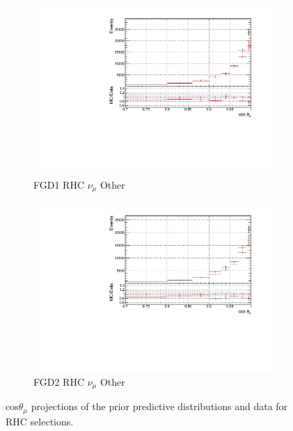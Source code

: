 \begin{figure}[!h]
\begin{subfigure}{0.49\textwidth}
  \centering
  \includegraphics[width=\textwidth]{figs/prioronly1D_t_FGD1_NuMuBkg_CCOther_in_AntiNu_Mode}
  \caption{FGD1 RHC $\nu_{\mu}$ Other}
\end{subfigure}
\begin{subfigure}{0.49\textwidth}
  \centering
  \includegraphics[width=\textwidth]{figs/prioronly1D_t_FGD2_NuMuBkg_CCOther_in_AntiNu_Mode}
  \caption{FGD2 RHC $\nu_{\mu}$ Other}
\end{subfigure}
\caption{cos$\theta_{\mu}$ projections of the prior predictive distributions and data for RHC \numu selections.}
\label{fig:priorpost_rhc_numu_t}
\end{figure}
